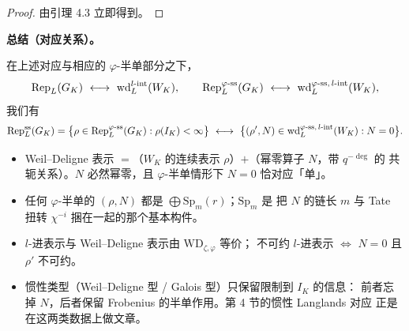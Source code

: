 \begin{proof}
由引理 4.3 立即得到。
\end{proof}

\begin{center}
\textbf{总结（对应关系）。}
\end{center}

在上述对应与相应的 $\varphi$-半单部分之下，
\[
\Rep_L(G_K)\ \longleftrightarrow\ \mathrm{wd}^{l\text{-}\mathrm{int}}_L(W_K),
\qquad
\Rep^{\varphi\text{-}\mathrm{ss}}_L(G_K)\ \longleftrightarrow\
\mathrm{wd}^{\varphi\text{-}\mathrm{ss},\,l\text{-}\mathrm{int}}_L(W_K),
\]
我们有
\[
\mathrm{Rep}^{\mathrm{ss}}_L(G_K)=\bigl\{\rho\in\mathrm{Rep}^{\varphi\text{-}\mathrm{ss}}_L(G_K):
\rho(I_K)<\infty\bigr\}
\ \longleftrightarrow\
\bigl\{(\rho',N)\in\mathrm{wd}^{\varphi\text{-}\mathrm{ss},\,l\text{-}\mathrm{int}}_L(W_K):N=0\bigr\}.
\]

\begin{keytakeaways}
\begin{itemize}[leftmargin=1.5em]
\item Weil--Deligne 表示 $=$（$W_K$ 的连续表示 $\rho$）$+$（幂零算子 $N$，带 $q^{-\deg}$ 的
      共轭关系）。$N$ 必然幂零，且 $\varphi$-半单情形下 $N=0$ 恰对应「单」。
\item 任何 $\varphi$-半单的 $(\rho,N)$ 都是 $\bigoplus\mathrm{Sp}_m(r)$；$\mathrm{Sp}_m$ 是
      把 $N$ 的链长 $m$ 与 Tate 扭转 $\chi^{-i}$ 捆在一起的那个基本构件。
\item $l$-进表示与 Weil--Deligne 表示由 $\mathrm{WD}_{\zeta,\varphi}$ 等价；
      不可约 $l$-进表示 $\Leftrightarrow$ $N=0$ 且 $\rho'$ 不可约。
\item 惯性类型（Weil--Deligne 型 / Galois 型）只保留限制到 $I_K$ 的信息：
      前者忘掉 $N$，后者保留 Frobenius 的半单作用。第 4 节的惯性 Langlands 对应
      正是在这两类数据上做文章。
\end{itemize}
\end{keytakeaways}
